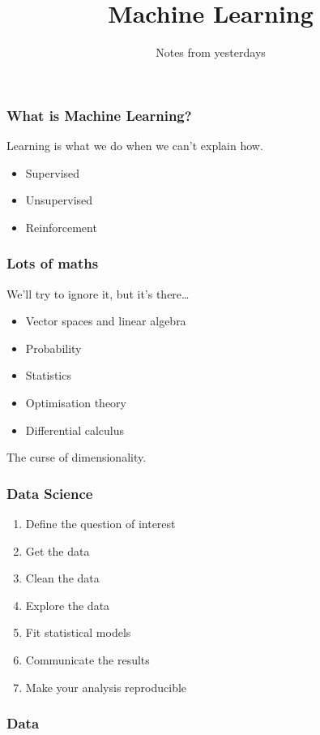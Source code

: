 
\title
{Machine Learning}
\subtitle{Notes from yesterdays}




\begin{frame}
  \titlepage
\end{frame}

\begin{frame}
  \frametitle{What is Machine Learning?}
  Learning is what we do when we can't explain how.
  \begin{itemize}
  \item Supervised
  \item Unsupervised
  \item Reinforcement
  \end{itemize}
\end{frame}

\begin{frame}
  \frametitle{Lots of maths}
  We'll try to ignore it, but it's there\dots
  \begin{itemize}
  \item Vector spaces and linear algebra
  \item Probability
  \item Statistics
  \item Optimisation theory
  \item Differential calculus
  \end{itemize}
  The curse of dimensionality.
\end{frame}

\begin{frame}
  \frametitle{Data Science}
  \begin{enumerate}
  \item Define the question of interest
  \item Get the data
  \item Clean the data
  \item Explore the data
  \item Fit statistical models
  \item Communicate the results
  \item Make your analysis reproducible
  \end{enumerate}
\end{frame}

\begin{frame}
  \frametitle{Data}
\end{frame}

